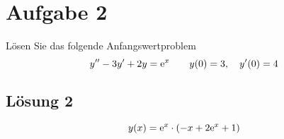 \documentclass[main.tex]{subfiles}
\begin{document}
\section{Aufgabe 2}
Lösen Sie das folgende Anfangswertproblem
\begin{equation*}
    y'' - 3y' + 2y = \mathrm{e}^x \qquad y(0)=3, \quad y'(0)=4
\end{equation*}

\subsection{Lösung 2}

$$
    y(x) = \mathrm{e}^x \cdot \left(-x + 2 \mathrm{e}^x + 1\right)
$$
\end{document}
